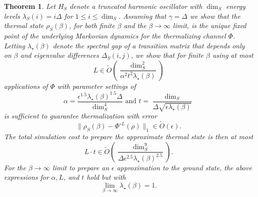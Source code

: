\documentclass{article}
\newtheorem{theorem}{Theorem}
\newcommand{\norm}[1]{\| #1 \|}
\newcommand{\bigotilde}[1]{\widetilde{O} \left( #1 \right)}
\begin{document}
\begin{theorem}\label{thm:harmonic_oscillator}
    Let $H_S$ denote a truncated harmonic oscillator with $\dim_S$ energy levels $\lambda_S(i) = i \Delta$ for $1 \le i \le \dim_S$. Assuming that $\gamma = \Delta$ we show that the thermal state $\rho_S(\beta)$, for both finite $\beta$ and the $\beta \to \infty$ limit, is the unique fixed point of the underlying Markovian dynamics for the thermalizing channel $\Phi$. Letting $\lambda_\star(\beta)$ denote the spectral gap of a transition matrix that depends only on $\beta$ and eigenvalue differences $\Delta_S(i,j)$, we show that for finite $\beta$ using at most
    \begin{equation}
        L \in \bigotilde{\frac{\dim_S^2}{\alpha^2 t^2 \lambda_\star(\beta)}}
    \end{equation}
    applications of $\Phi$ with parameter settings of
    \begin{equation}
        \alpha = \frac{\epsilon^{1.5} \lambda_\star(\beta)^{1.5} \Delta}{\dim_S^4} \text{ and } t = \frac{\dim_S}{\Delta \sqrt{\epsilon \lambda_\star(\beta)}}
    \end{equation}
    is sufficient to guarantee thermalization with error
    \begin{equation}
        \norm{\rho_S(\beta) - \Phi^{\circ L}(\rho)}_1 \in \bigotilde{\epsilon}.
    \end{equation}
    The total simulation cost to prepare the approximate thermal state is then at most
    \begin{equation}
        L \cdot t \in \bigotilde{\frac{\dim_S^9}{\Delta \epsilon^{2.5} \lambda_{\star}(\beta)^{2.5}}}.
    \end{equation}
    For the $\beta \to \infty$ limit to prepare an $\epsilon$ approximation to the ground state, the above expressions for $\alpha, L$, and $t$ hold but with 
    \begin{equation}
        \lim_{\beta \to \infty} \lambda_\star(\beta) = 1.
    \end{equation}
\end{theorem}
\end{document}
